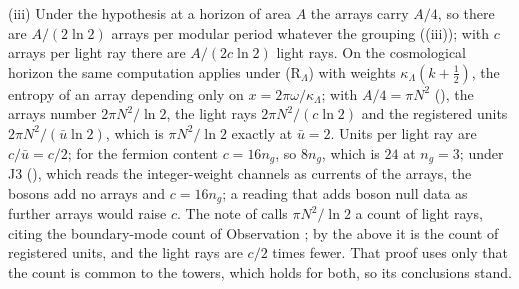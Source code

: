(iii) Under the hypothesis at a horizon of area $A$ the arrays carry $A/4$, so there are $A/(2\ln 2)$ arrays per modular period whatever the grouping ((iii)); with $c$ arrays per light ray there are $A/(2c\ln 2)$ light rays. On the cosmological horizon the same computation applies under (R$_{\Lambda}$) with weights $\kappa_{\Lambda}(k + \tfrac12)$, the entropy of an array depending only on $x = 2\pi\omega/\kappa_{\Lambda}$; with $A/4 = \pi N^{2}$ (), the arrays number $2\pi N^{2}/\ln 2$, the light rays $2\pi N^{2}/(c\ln 2)$ and the registered units $2\pi N^{2}/(\bar u\ln 2)$, which is $\pi N^{2}/\ln 2$ exactly at $\bar u = 2$. Units per light ray are $c/\bar u = c/2$; for the fermion content $c = 16n_{g}$, so $8n_{g}$, which is $24$ at $n_{g} = 3$; under J3 (), which reads the integer-weight channels as currents of the arrays, the bosons add no arrays and $c = 16n_{g}$; a reading that adds boson null data as further arrays would raise $c$. The note of  calls $\pi N^{2}/\ln 2$ a count of light rays, citing the boundary-mode count of Observation ; by the above it is the count of registered units, and the light rays are $c/2$ times fewer. That proof uses only that the count is common to the towers, which holds for both, so its conclusions stand.
